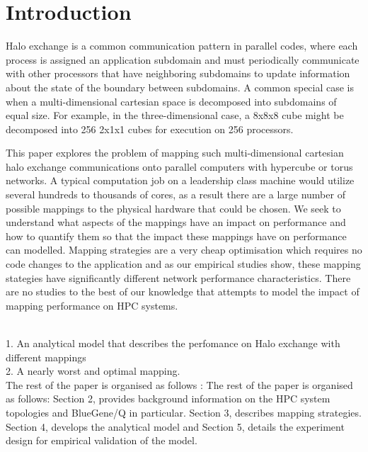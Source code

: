 \documentclass{acm_proc_article-sp}
\begin{document}
\section{Introduction}

Halo exchange is a common communication pattern in parallel codes, where
each process is assigned an application subdomain and must periodically
communicate with other processors that have neighboring subdomains to
update information about the state of the boundary between subdomains.
A common special case is when a multi-dimensional cartesian space is
decomposed into subdomains of equal size.  For example, in the three-dimensional
case, a 8x8x8 cube might be decomposed into 256 2x1x1 cubes for execution on 256 processors.

This paper explores the problem of mapping such multi-dimensional cartesian
halo exchange communications onto parallel computers with hypercube or
torus networks. A typical computation job on a leadership class machine would
utilize several hundreds to thousands of cores, as a result there are a large number of
possible mappings to the physical hardware that could be chosen. We seek to understand
what aspects of the mappings have an impact on performance and how to quantify them so
that the impact these mappings have on performance can modelled. Mapping strategies
are a very cheap optimisation which requires no code changes to the application
and as our empirical studies show, these mapping stategies have significantly
different network performance characteristics. There are no studies to the best
of our knowledge that attempts to model the impact of mapping performance on
HPC systems.

\\
1. An analytical model that describes the perfomance on Halo exchange with different mappings\\
2. A nearly worst and optimal mapping.\\

The rest of the paper is organised as follows :
The rest of the paper is organised as follows: Section 2, provides background information on
the HPC system topologies and BlueGene/Q in particular. Section 3, describes mapping strategies.
Section 4, develops the analytical model and Section 5, details the experiment design for empirical
validation of the model.

\end{document}
